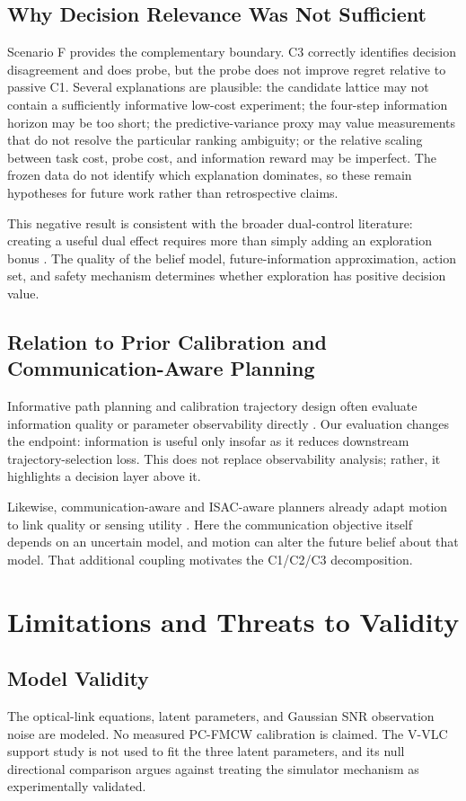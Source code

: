 \documentclass[journal]{IEEEtran}
\begin{document}
\subsection{Why Decision Relevance Was Not Sufficient}
Scenario F provides the complementary boundary. C3 correctly identifies decision disagreement and does probe, but the probe does not improve regret relative to passive C1. Several explanations are plausible: the candidate lattice may not contain a sufficiently informative low-cost experiment; the four-step information horizon may be too short; the predictive-variance proxy may value measurements that do not resolve the particular ranking ambiguity; or the relative scaling between task cost, probe cost, and information reward may be imperfect. The frozen data do not identify which explanation dominates, so these remain hypotheses for future work rather than retrospective claims.

This negative result is consistent with the broader dual-control literature: creating a useful dual effect requires more than simply adding an exploration bonus \cite{mesbah2018,hu2024}. The quality of the belief model, future-information approximation, action set, and safety mechanism determines whether exploration has positive decision value.

\subsection{Relation to Prior Calibration and Communication-Aware Planning}
Informative path planning and calibration trajectory design often evaluate information quality or parameter observability directly \cite{hitz2017,lv2022,amersdorfer2025}. Our evaluation changes the endpoint: information is useful only insofar as it reduces downstream trajectory-selection loss. This does not replace observability analysis; rather, it highlights a decision layer above it.

Likewise, communication-aware and ISAC-aware planners already adapt motion to link quality or sensing utility \cite{ghaffarkhah2011,gordon2026,jin2026}. Here the communication objective itself depends on an uncertain model, and motion can alter the future belief about that model. That additional coupling motivates the C1/C2/C3 decomposition.

\section{Limitations and Threats to Validity}
\subsection{Model Validity}
The optical-link equations, latent parameters, and Gaussian SNR observation noise are modeled. No measured PC-FMCW calibration is claimed. The V-VLC support study is not used to fit the three latent parameters, and its null directional comparison argues against treating the simulator mechanism as experimentally validated.
\end{document}
